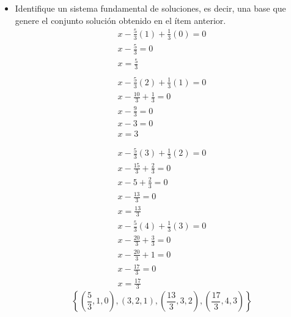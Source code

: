 \begin{itemize}
    \item Identifique un sistema fundamental de soluciones, es decir, una base que genere el conjunto solución obtenido en el ítem anterior.
    \[
        \begin{aligned}
            x-\frac{5}{3}(1)+\frac{1}{3}(0)=0 \\
            x-\frac{5}{3}=0 \\
            x=\frac{5}{3} \\
        \end{aligned}
    \]
    \[
        \begin{aligned}
            x-\frac{5}{3}(2)+\frac{1}{3}(1)=0 \\
            x-\frac{10}{3}+\frac{1}{3}=0 \\
            x-\frac{9}{3}=0 \\
            x-3=0 \\
            x=3 \\ \\
        \end{aligned}
    \]
    \[
        \begin{aligned}
            x-\frac{5}{3}(3)+\frac{1}{3}(2)=0 \\
            x-\frac{15}{3}+\frac{2}{3}=0 \\
            x-5+\frac{2}{3}=0 \\
            x-\frac{13}{3}=0\\
            x=\frac{13}{3}
        \end{aligned}
    \]
    \[
        \begin{aligned}
            x-\frac{5}{3}(4)+\frac{1}{3}(3)=0 \\
            x-\frac{20}{3}+\frac{3}{3}=0 \\
            x-\frac{20}{3}+1=0 \\
            x-\frac{17}{3}=0 \\
            x=\frac{17}{3}
        \end{aligned}
    \]
    \[
        \left\{
            \left(
                \frac{5}{3},1,0
            \right),
            \left(
                3,2,1
            \right),
            \left(
                \frac{13}{3},3,2
            \right),
            \left(
                \frac{17}{3},4,3
            \right)
        \right\}
    \]
    \begin{figure}[ht!]
        \centering

\end{figure}
\end{itemize}
